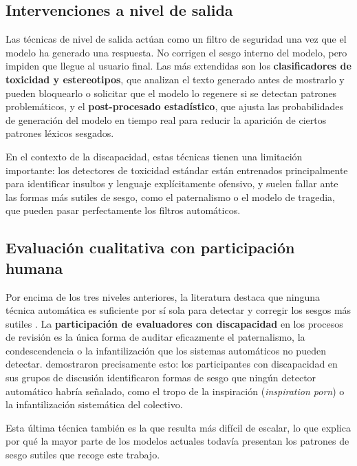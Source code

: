 \documentclass[12pt]{report} %
\renewcommand{\_}{\oldunderscore\allowbreak}
\begin{document}
\subsection{Intervenciones a nivel de salida}
Las técnicas de nivel de salida actúan como un filtro de seguridad una vez que el modelo ha generado una respuesta. No corrigen el sesgo interno del modelo, pero impiden que llegue al usuario final. Las más extendidas son los \textbf{clasificadores de toxicidad y estereotipos}, que analizan el texto generado antes de mostrarlo y pueden bloquearlo o solicitar que el modelo lo regenere si se detectan patrones problemáticos, y el \textbf{post-procesado estadístico}, que ajusta las probabilidades de generación del modelo en tiempo real para reducir la aparición de ciertos patrones léxicos sesgados.

En el contexto de la discapacidad, estas técnicas tienen una limitación importante: los detectores de toxicidad estándar están entrenados principalmente para identificar insultos y lenguaje explícitamente ofensivo, y suelen fallar ante las formas más sutiles de sesgo, como el paternalismo o el modelo de tragedia, que pueden pasar perfectamente los filtros automáticos.

\subsection{Evaluación cualitativa con participación humana}
Por encima de los tres niveles anteriores, la literatura destaca que ninguna técnica automática es suficiente por sí sola para detectar y corregir los sesgos más sutiles \cite{gadiraju2023disability}. La \textbf{participación de evaluadores con discapacidad} en los procesos de revisión es la única forma de auditar eficazmente el paternalismo, la condescendencia o la infantilización que los sistemas automáticos no pueden detectar. \citeauthor{gadiraju2023disability} \cite{gadiraju2023disability} demostraron precisamente esto: los participantes con discapacidad en sus grupos de discusión identificaron formas de sesgo que ningún detector automático habría señalado, como el tropo de la inspiración (\textit{inspiration porn}) o la infantilización sistemática del colectivo.

Esta última técnica también es la que resulta más difícil de escalar, lo que explica por qué la mayor parte de los modelos actuales todavía presentan los patrones de sesgo sutiles que recoge este trabajo.
\end{document}

